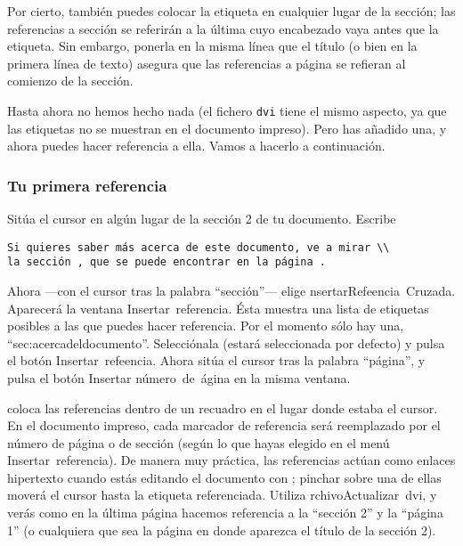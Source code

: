 Por cierto, también puedes colocar la etiqueta en cualquier lugar
de la sección; las referencias a sección se referirán a la última
cuyo encabezado vaya antes que la etiqueta. Sin embargo, ponerla en
la misma línea que el título (o bien en la primera línea de texto)
asegura que las referencias a página se refieran al comienzo de la
sección.

Hasta ahora no hemos hecho nada (el fichero \texttt{dvi} tiene el
mismo aspecto, ya que las etiquetas no se muestran en el documento
impreso). Pero has añadido una, y ahora puedes hacer referencia a
ella. Vamos a hacerlo a continuación.


\subsubsection*{Tu primera referencia}

Sitúa el cursor en algún lugar de la sección 2 de tu documento. Escribe

\begin{verbatim}
Si quieres saber más acerca de este documento, ve a mirar \\
la sección , que se puede encontrar en la página .
\end{verbatim}

Ahora ---con el cursor tras la palabra {}``sección''--- elige \textsf{}\textsf{nsertar\lyxarrow{}Refe}\textsf{}\textsf{encia~Cruzada}.
Aparecerá la ventana \textsf{Insertar~referencia}. Ésta muestra una
lista de etiquetas posibles a las que puedes hacer referencia. Por
el momento sólo hay una, {}``sec:acercadeldocumento''. Selecciónala
(estará seleccionada por defecto) y pulsa el botón \textsf{Insertar~refe}\textsf{}\textsf{encia}.
Ahora sitúa el cursor tras la palabra {}``página'', y pulsa el botón
\textsf{Insertar número~de~}\textsf{}\textsf{ágina}
en la misma ventana.

\LyX{} coloca las referencias dentro de un recuadro en el lugar donde
estaba el cursor. En el documento impreso, cada marcador de referencia
será reemplazado por el número de página o de sección (según lo que
hayas elegido en el menú \textsf{Insertar~referencia}). De manera
muy práctica, las referencias actúan como enlaces hipertexto cuando
estás editando el documento con \LyX{}; pinchar sobre una de ellas
moverá el cursor hasta la etiqueta referenciada. Utiliza \textsf{}\textsf{rchivo\lyxarrow{}Actualizar~dvi},
y verás como en la última página hacemos referencia a la {}``sección
2'' y la {}``página 1'' (o cualquiera que sea la página en donde
aparezca el título de la sección 2).


